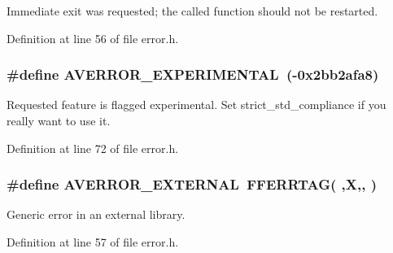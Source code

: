 Immediate exit was requested; the called function should not be restarted. 



Definition at line 56 of file error.\+h.

\subsubsection[{\texorpdfstring{A\+V\+E\+R\+R\+O\+R\+\_\+\+E\+X\+P\+E\+R\+I\+M\+E\+N\+T\+AL}{AVERROR_EXPERIMENTAL}}]{\setlength{\rightskip}{0pt plus 5cm}\#define A\+V\+E\+R\+R\+O\+R\+\_\+\+E\+X\+P\+E\+R\+I\+M\+E\+N\+T\+AL~(-\/0x2bb2afa8)}\hypertarget{group__lavu__error_ga3d2f16ec410d409c19e3547673b8469b}{}\label{group__lavu__error_ga3d2f16ec410d409c19e3547673b8469b}


Requested feature is flagged experimental. Set strict\+\_\+std\+\_\+compliance if you really want to use it. 



Definition at line 72 of file error.\+h.

\subsubsection[{\texorpdfstring{A\+V\+E\+R\+R\+O\+R\+\_\+\+E\+X\+T\+E\+R\+N\+AL}{AVERROR_EXTERNAL}}]{\setlength{\rightskip}{0pt plus 5cm}\#define A\+V\+E\+R\+R\+O\+R\+\_\+\+E\+X\+T\+E\+R\+N\+AL~{\bf F\+F\+E\+R\+R\+T\+AG}( \textquotesingle{},\textquotesingle{}X\textquotesingle{},\textquotesingle{},\textquotesingle{} \textquotesingle{})}\hypertarget{group__lavu__error_ga9c520e483ba8648495620ffdb4c491f2}{}\label{group__lavu__error_ga9c520e483ba8648495620ffdb4c491f2}


Generic error in an external library. 



Definition at line 57 of file error.\+h.

